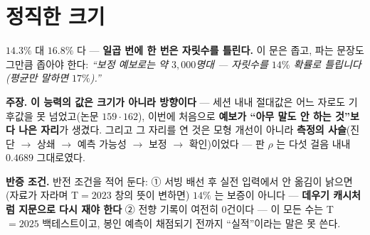 \documentclass[10pt,a4paper]{article}
\newcommand{\claim}[2]{\begin{claimbox}\textbf{주장.} #1\par\smallskip
  \textcolor{gray!70}{\textbf{반증 조건.} #2}\end{claimbox}}
\begin{document}
\section{정직한 크기}

$14.3\%$ 대 $16.8\%$ 다 --- \textbf{일곱 번에 한 번은 자릿수를 틀린다.} 이 문은
좁고, 파는 문장도 그만큼 좁아야 한다: \emph{``보정 예보로는 약 $3{,}000$명대
--- 자릿수를 $14\%$ 확률로 틀립니다(평균만 말하면 $17\%$).''}

\claim{\textbf{이 능력의 값은 크기가 아니라 방향이다} --- 세션 내내 절대값은
어느 자로도 기후값을 못 넘었고(논문 $159 \cdot 162$), 이번에 처음으로
\textbf{예보가 ``아무 말도 안 하는 것''보다 나은 자리}가 생겼다. 그리고 그
자리를 연 것은 모형 개선이 아니라 \textbf{측정의 사슬}(진단 $\to$ 상쇄 $\to$
예측 가능성 $\to$ 보정 $\to$ 확인)이었다 --- 판 $\rho$ 는 다섯 걸음 내내
$0.4689$ 그대로였다.}
{반전 조건을 적어 둔다: ① 서빙 배선 후 실전 입력에서 안 옮김이 낡으면(자료가
자라며 T$=2023$ 창의 뜻이 변하면) $14\%$ 는 보증이 아니다 --- \textbf{데우기
캐시처럼 지문으로 다시 재야 한다} ② 전향 기록이 여전히 $0$건이다 --- 이 모든
수는 T$=2025$ 백테스트이고, 봉인 예측이 채점되기 전까지 ``실적''이라는 말은
못 쓴다.}
\end{document}
